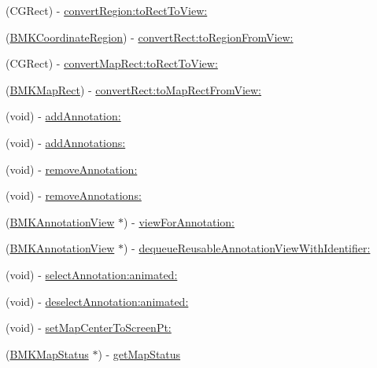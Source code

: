 \begin{DoxyCompactItemize}
\item 
(C\-G\-Rect) -\/ \hyperlink{interface_b_m_k_map_view_a952023c2e24a13c993977d276745f329}{convert\-Region\-:to\-Rect\-To\-View\-:}
\item 
(\hyperlink{struct_b_m_k_coordinate_region}{B\-M\-K\-Coordinate\-Region}) -\/ \hyperlink{interface_b_m_k_map_view_ae99130c0eceabae6c9e202699ba375d1}{convert\-Rect\-:to\-Region\-From\-View\-:}
\item 
(C\-G\-Rect) -\/ \hyperlink{interface_b_m_k_map_view_a4a802244887690c7238bd5c8e18918ae}{convert\-Map\-Rect\-:to\-Rect\-To\-View\-:}
\item 
(\hyperlink{struct_b_m_k_map_rect}{B\-M\-K\-Map\-Rect}) -\/ \hyperlink{interface_b_m_k_map_view_afa77dab84c13620c4ce0dee46df87b46}{convert\-Rect\-:to\-Map\-Rect\-From\-View\-:}
\item 
(void) -\/ \hyperlink{interface_b_m_k_map_view_a1bf0349f0eb4580ca23eac1032345925}{add\-Annotation\-:}
\item 
(void) -\/ \hyperlink{interface_b_m_k_map_view_ad863c0ccb09937907188a408103f8234}{add\-Annotations\-:}
\item 
(void) -\/ \hyperlink{interface_b_m_k_map_view_a5a6efcf38e824c225c8dc3132edb4c02}{remove\-Annotation\-:}
\item 
(void) -\/ \hyperlink{interface_b_m_k_map_view_aa3cccccb36e36704debcdeb0093559f2}{remove\-Annotations\-:}
\item 
(\hyperlink{interface_b_m_k_annotation_view}{B\-M\-K\-Annotation\-View} $\ast$) -\/ \hyperlink{interface_b_m_k_map_view_ac93853efa99f78f20cc2b260bc734511}{view\-For\-Annotation\-:}
\item 
(\hyperlink{interface_b_m_k_annotation_view}{B\-M\-K\-Annotation\-View} $\ast$) -\/ \hyperlink{interface_b_m_k_map_view_a295564a4e2ed533a7ba2fc9f0fe3c008}{dequeue\-Reusable\-Annotation\-View\-With\-Identifier\-:}
\item 
(void) -\/ \hyperlink{interface_b_m_k_map_view_a9b26d1286a51cf260bea06d8ed220316}{select\-Annotation\-:animated\-:}
\item 
(void) -\/ \hyperlink{interface_b_m_k_map_view_a8d2f82aae2c0a536c057239442573fb2}{deselect\-Annotation\-:animated\-:}
\item 
(void) -\/ \hyperlink{interface_b_m_k_map_view_afc552204ea098d293a4f0d7ebf35b8ac}{set\-Map\-Center\-To\-Screen\-Pt\-:}
\item 
(\hyperlink{interface_b_m_k_map_status}{B\-M\-K\-Map\-Status} $\ast$) -\/ \hyperlink{interface_b_m_k_map_view_a419f8ac73742ccf9ef7fb921b349bca4}{get\-Map\-Status}

\end{DoxyCompactItemize}
